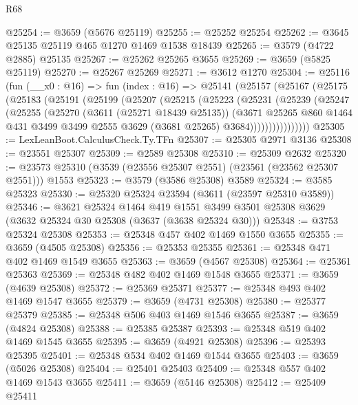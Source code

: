 \begin{lexlean}{R68}
\begin{coremodule}
@25254 := @3659 (@5676 @25119)
@25255 := @25252 @25254
@25262 := @3645 @25135 @25119 @465 @1270 @1469 @1538 @18439
@25265 := @3579 (@4722 @2885) @25135
@25267 := @25262 @25265 @3655
@25269 := @3659 (@5825 @25119)
@25270 := @25267 @25269
@25271 := @3612 @1270
@25304 := @25116
    (fun (__x0 : @16) =>
    fun (index : @16) =>
    @25141
      (@25157
        (@25167
          (@25175
            (@25183
              (@25191
                (@25199
                  (@25207
                    (@25215
                      (@25223
                        (@25231
                          (@25239
                            (@25247
                              (@25255
                                (@25270
                                  (@3611 (@25271 @18439 @25135))
                                  (@3671
                                    @25265
                                    @860
                                    @1464
                                    @431
                                    @3499
                                    @3499
                                    @2555
                                    @3629
                                    (@3681 @25265)
                                    @3684))))))))))))))))
@25305 := LexLeanBoot.CalculusCheck.Ty.TFn
@25307 := @25305 @2971 @3136
@25308 := @23551 @25307
@25309 := @2589 @25308
@25310 := @25309 @2632
@25320 := @23573 @25310 (@3539 (@23556 @25307 @2551) (@23561 (@23562 @25307 @2551))) @1553
@25323 := @3579 (@3586 @25308) @3589
@25324 := @3585 @25323
@25330 := @25320 @25324 @23594 (@3611 (@23597 @25310 @3589))
@25346 := @3621
    @25324
    @1464
    @419
    @1551
    @3499
    @3501
    @25308
    @3629
    (@3632 @25324 @30 @25308 (@3637 (@3638 @25324 @30)))
@25348 := @3753 @25324 @25308
@25353 := @25348 @457 @402 @1469 @1550 @3655
@25355 := @3659 (@4505 @25308)
@25356 := @25353 @25355
@25361 := @25348 @471 @402 @1469 @1549 @3655
@25363 := @3659 (@4567 @25308)
@25364 := @25361 @25363
@25369 := @25348 @482 @402 @1469 @1548 @3655
@25371 := @3659 (@4639 @25308)
@25372 := @25369 @25371
@25377 := @25348 @493 @402 @1469 @1547 @3655
@25379 := @3659 (@4731 @25308)
@25380 := @25377 @25379
@25385 := @25348 @506 @403 @1469 @1546 @3655
@25387 := @3659 (@4824 @25308)
@25388 := @25385 @25387
@25393 := @25348 @519 @402 @1469 @1545 @3655
@25395 := @3659 (@4921 @25308)
@25396 := @25393 @25395
@25401 := @25348 @534 @402 @1469 @1544 @3655
@25403 := @3659 (@5026 @25308)
@25404 := @25401 @25403
@25409 := @25348 @557 @402 @1469 @1543 @3655
@25411 := @3659 (@5146 @25308)
@25412 := @25409 @25411

\end{coremodule}
\end{lexlean}
